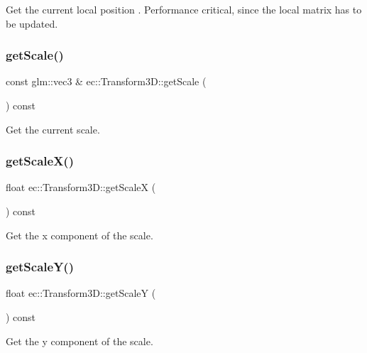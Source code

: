 Get the current local position . Performance critical, since the local matrix has to be updated. \mbox{\label{classec_1_1_transform3_d_ab5f0e26d19bbb99a4624784d3024e654}} 
\subsubsection{\texorpdfstring{get\+Scale()}{getScale()}}
{\footnotesize\ttfamily const glm\+::vec3 \& ec\+::\+Transform3\+D\+::get\+Scale (\begin{DoxyParamCaption}{ }\end{DoxyParamCaption}) const}

Get the current scale. \mbox{\label{classec_1_1_transform3_d_a7ecc00577cd57f15ed63926a712cdcb1}} 
\subsubsection{\texorpdfstring{get\+Scale\+X()}{getScaleX()}}
{\footnotesize\ttfamily float ec\+::\+Transform3\+D\+::get\+ScaleX (\begin{DoxyParamCaption}{ }\end{DoxyParamCaption}) const}

Get the x component of the scale. \mbox{\label{classec_1_1_transform3_d_a99763688e60bc36134390327344f5df0}} 
\subsubsection{\texorpdfstring{get\+Scale\+Y()}{getScaleY()}}
{\footnotesize\ttfamily float ec\+::\+Transform3\+D\+::get\+ScaleY (\begin{DoxyParamCaption}{ }\end{DoxyParamCaption}) const}

Get the y component of the scale. \mbox{\label{classec_1_1_transform3_d_ad79cc7092172c384e46b426059928672}} 
